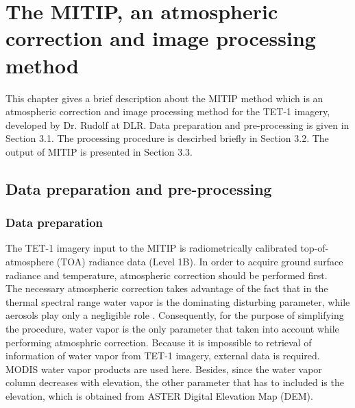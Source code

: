\chapter{The MITIP, an atmospheric correction and image processing method}

\label{Chapter3}

This chapter gives a brief description about the MITIP method which is an atmospheric correction and image processing method for the TET-1 imagery, developed by Dr. Rudolf at DLR. Data preparation and pre-processing is given in Section 3.1. The processing procedure is descirbed briefly in Section 3.2. The output of MITIP is presented in Section 3.3.\\


\section{Data preparation and pre-processing}


\subsection{Data preparation}
The TET-1 imagery input to the MITIP is radiometrically calibrated top-of-atmosphere (TOA) radiance data (Level 1B). In order to acquire ground surface radiance and temperature, atmospheric correction should be performed first.\\

\noindent The necessary atmospheric correction takes advantage of the fact that in the thermal spectral range water vapor is the dominating disturbing parameter, while aerosols play only a negligible role \parencite{Reference204}. Consequently, for the purpose of simplifying the procedure, water vapor is the only parameter that taken into account while performing atmosphric correction. Because it is impossible to retrieval of information of water vapor from TET-1 imagery, external data is required. MODIS water vapor products are used here. Besides, since the water vapor column decreases with elevation, the other parameter that has to included is the elevation, which is obtained from ASTER Digital Elevation Map (DEM).\\


